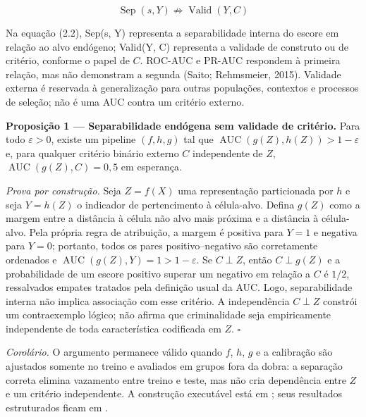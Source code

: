 \begin{equation}\label{eq:validade} \operatorname{Sep}(s,Y)\not\Rightarrow\operatorname{Valid}(Y,C) \end{equation}

Na equação (2.2), Sep(s, Y) representa a separabilidade interna do escore em relação ao alvo endógeno; Valid(Y, C) representa a validade de construto ou de critério, conforme o papel de $C$. ROC-AUC e PR-AUC respondem à primeira relação, mas não demonstram a segunda (Saito; Rehmsmeier, 2015). Validade externa é reservada à generalização para outras populações, contextos e processos de seleção; não é uma AUC contra um critério externo.

\begin{boxtext}\textbf{Proposição 1 --- Separabilidade endógena sem validade de critério.} Para todo $\varepsilon>0$, existe um pipeline $(f,h,g)$ tal que $\operatorname{AUC}(g(Z),h(Z))>1-\varepsilon$ e, para qualquer critério binário externo $C$ independente de $Z$, $\operatorname{AUC}(g(Z),C)=0,5$ em esperança.

\textit{Prova por construção.} Seja $Z=f(X)$ uma representação particionada por $h$ e seja $Y=h(Z)$ o indicador de pertencimento à célula-alvo. Defina $g(Z)$ como a margem entre a distância à célula não alvo mais próxima e a distância à célula-alvo. Pela própria regra de atribuição, a margem é positiva para $Y=1$ e negativa para $Y=0$; portanto, todos os pares positivo--negativo são corretamente ordenados e $\operatorname{AUC}(g(Z),Y)=1>1-\varepsilon$. Se $C\perp Z$, então $C\perp g(Z)$ e a probabilidade de um escore positivo superar um negativo em relação a $C$ é $1/2$, ressalvados empates tratados pela definição usual da AUC. Logo, separabilidade interna não implica associação com esse critério. A independência $C\perp Z$ constrói um contraexemplo lógico; não afirma que criminalidade seja empiricamente independente de toda característica codificada em $Z$. $\square$

\textit{Corolário.} O argumento permanece válido quando $f$, $h$, $g$ e a calibração são ajustados somente no treino e avaliados em grupos fora da dobra: a separação correta elimina vazamento entre treino e teste, mas não cria dependência entre $Z$ e um critério independente. A construção executável está em ; seus resultados estruturados ficam em .\end{boxtext}

